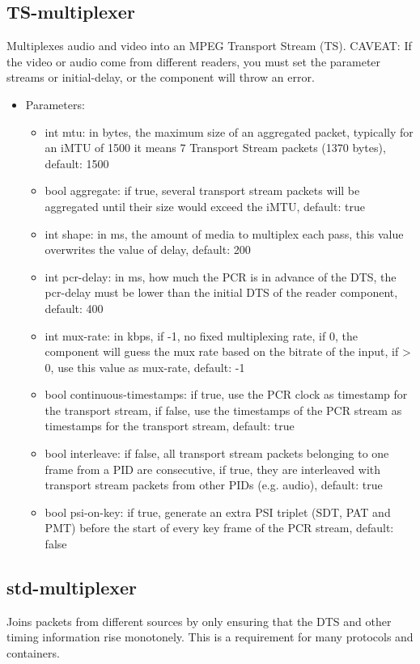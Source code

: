 \subsection{TS-multiplexer}
Multiplexes audio and video into an MPEG Transport Stream (TS). CAVEAT: If the video or audio come from different readers, you must set the parameter streams or initial-delay, or the component will throw an error.
\begin{itemize}
\item Parameters:
\begin{itemize}
\item int mtu: in bytes, the maximum size of an aggregated packet, typically for an iMTU of 1500 it means 7 Transport Stream packets (1370 bytes), default: 1500
\item bool aggregate: if true, several transport stream packets will be aggregated until their size would exceed the iMTU, default: true
\item int shape: in ms, the amount of media to multiplex each pass, this value overwrites the value of delay, default: 200
\item int pcr-delay: in ms, how much the PCR is in advance of the DTS, the pcr-delay must be lower than the initial DTS of the reader component, default: 400
\item int mux-rate: in kbps, if -1, no fixed multiplexing rate, if 0, the component will guess the mux rate based on the bitrate of the input, if > 0, use this value as mux-rate, default: -1
\item bool continuous-timestamps: if true, use the PCR clock as timestamp for the transport stream, if false, use the timestamps of the PCR stream as timestamps for the transport stream, default: true
\item bool interleave: if false, all transport stream packets belonging to one frame from a PID are consecutive, if true, they are interleaved with transport stream packets from other PIDs (e.g. audio), default: true
\item bool psi-on-key: if true, generate an extra PSI triplet (SDT, PAT and PMT) before the start of every key frame of the PCR stream, default: false
\end{itemize}
\end{itemize}
\subsection{std-multiplexer}
Joins packets from different sources by only ensuring that the DTS and other timing information rise monotonely. This is a requirement for many protocols and containers.
